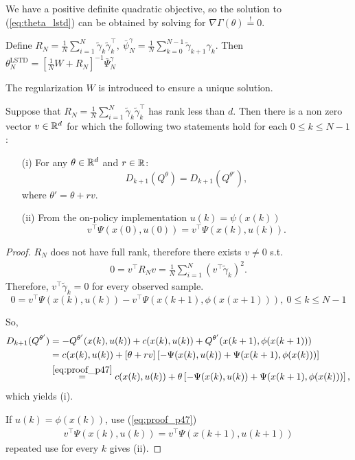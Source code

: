 We have a positive definite quadratic objective, so the solution to (\ref{eq:theta_lstd})
can be obtained by solving for \(\nabla\Gamma(\theta)\stackrel{!}{=}0\).
\begin{proposition}\label{prop:46}
    Define \(R_N=\frac{1}{N}\sum_{i=1}^N\tilde{\gamma}_k\tilde{\gamma}_k^\intercal,\ \bar{\psi}_N^\gamma=\frac{1}{N}\sum_{k=0}^{N-1}\tilde{\gamma}_{k+1}\gamma_k\).
    Then \(\theta_N^\text{LSTD}=\left[\frac{1}{N}W+R_N\right]^{-1}\bar{\Psi}_N^\gamma\)
\end{proposition}  %
The regularization \(W\) is introduced to ensure a unique solution.
\begin{proposition}\label{prop:47}
    Suppose that \(R_N=\frac{1}{N}\sum_{i=1}^N\tilde{\gamma}_k\tilde{\gamma}_k^\intercal\) has rank less 
    than \(d\). Then there is a non zero vector \(v\in\mathbb{R}^d\) for which the following two statements 
    hold for each \(0\leq k\leq N-1\):
    \begin{enumerate}
        \item[(i)] For any \(\theta\in\mathbb{R}^d\) and \(r\in \mathbb{R}\): \[D_{k+1}(Q^\theta)=D_{k+1}(Q^{\theta'}),\] where \(\theta'=\theta+rv.\)
        \item[(ii)] From the on-policy implementation \(u(k)=\psi(x(k))\) \[v^\intercal \Psi(x(0),u(0)) = v^\intercal\Psi(x(k),u(k)).\] 
    \end{enumerate} 
\end{proposition}
\begin{proof}
\(R_N\) does not have full rank, therefore there exists \(v\neq 0\) s.t. 
\begin{align*}
    0=v^\intercal R_Nv=\frac{1}{N}\sum_{i=1}^N(v^\intercal \tilde{\gamma}_k)^2.
\end{align*}        
Therefore, \(v^\intercal \tilde{\gamma}_k=0\) for every observed sample.
\begin{equation}\label{eq:proof_p47}
    0=v^\intercal \Psi(x(k),u(k))-v^\intercal \Psi(x(k+1),\phi(x(x+1))),\ 0\leq k\leq N-1
\end{equation}

So, \begin{align*}
    D_{k+1}(Q^{\theta'})&=-Q^{\theta'}(x(k),u(k))+c(x(k),u(k)) +Q^{\theta'}(x(k+1),\phi(x(k+1)))\\
    &=c(x(k),u(k))+\left[\theta+rv\right]\left[-\Psi(x(k),u(k))+\Psi(x(k+1),\phi(x(k)))\right]\\
    &\stackrel{\ref{eq:proof_p47}}{=}c(x(k),u(k))+\theta \left[-\Psi(x(k),u(k))+\Psi(x(k+1),\phi(x(k)))\right],
\end{align*}
which yields (i).

If \(u(k)=\phi(x(k))\), use (\ref{eq:proof_p47})
\begin{align*}
    v^\intercal \Psi(x(k),u(k))=v^\intercal\Psi(x(k+1),u(k+1))
\end{align*}
repeated use for every \(k\) gives (ii).

\end{proof}

